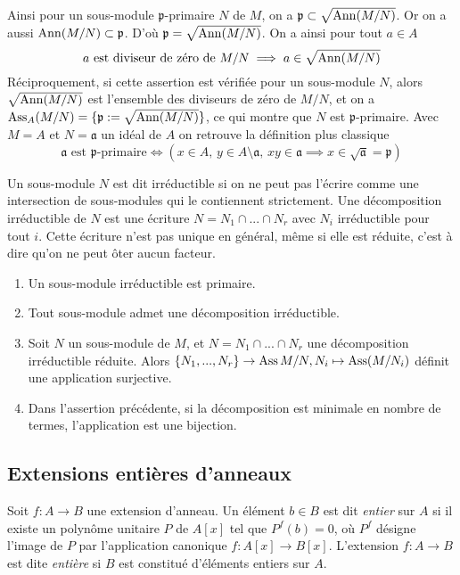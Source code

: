 \begin{rem}
Ainsi pour un sous-module $\mathfrak{p}$-primaire $N$ de $M$, on a $\mathfrak{p}\subset \sqrt{\operatorname{Ann}(M/N)}$. Or on a aussi $\operatorname{Ann}(M/N)\subset \mathfrak{p}$. D'où $\mathfrak{p}=\sqrt{\operatorname{Ann}(M/N)}$. On a ainsi pour tout $a\in A$
$$a\text{ est diviseur de zéro de } M/N \implies a\in\sqrt{\operatorname{Ann}(M/N)}$$
Réciproquement, si cette assertion est vérifiée pour un sous-module $N$, alors $\sqrt{\operatorname{Ann}(M/N)}$ est l'ensemble des diviseurs de zéro de $M/N$, et on a $\operatorname{Ass}_A(M/N)=\lbrace \mathfrak{p}:=\sqrt{\operatorname{Ann}(M/N)}\rbrace$, ce qui montre que $N$ est $\mathfrak{p}$-primaire. Avec $M=A$ et $N=\mathfrak{a}$ un idéal de $A$ on retrouve la définition plus classique
$$\mathfrak{a}\text{ est }\mathfrak{p}\text{-primaire} \iff (x\in A,\, y\in A\setminus\mathfrak{a},\,xy\in\mathfrak{a}\implies x\in \sqrt{\mathfrak{a}}=\mathfrak{p})$$
\end{rem}

Un sous-module $N$ est dit irréductible si on ne peut pas l'écrire comme une intersection de sous-modules qui le contiennent strictement. Une décomposition irréductible de $N$ est une écriture $N=N_1\cap...\cap N_r$ avec $N_i$ irréductible pour tout $i$. Cette écriture n'est pas unique en général, même si elle est réduite, c'est à dire qu'on ne peut ôter aucun facteur. 

\begin{thm}
\begin{enumerate}
\item Un sous-module irréductible est primaire.
\item Tout sous-module admet une décomposition irréductible.
\item Soit $N$ un sous-module de $M$, et $N=N_1\cap...\cap N_r$ une décomposition irréductible réduite. Alors $\lbrace N_1,...,N_r\rbrace\rightarrow \operatorname{Ass} M/N, N_i\mapsto \operatorname{Ass}(M/N_i)$ définit une application surjective.
\item Dans l'assertion précédente, si la décomposition est minimale en nombre de termes, l'application est une bijection.
\end{enumerate}
\end{thm}

\subsection{Extensions entières d'anneaux}

Soit $f:A\rightarrow B$ une extension d'anneau. Un élément $b\in B$ est dit \textit{entier} sur $A$ si il existe un polynôme unitaire $P$ de $A[x]$ tel que $P^f(b)=0$, où $P^f$ désigne l'image de $P$ par l'application canonique $f:A[x]\rightarrow B[x]$. L'extension $f:A\rightarrow B$ est dite \textit{entière} si $B$ est constitué d'éléments entiers sur $A$.

